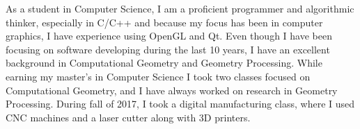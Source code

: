 \documentclass[10pt,stdletter,dateno,sigleft,letterpaper]{newlfm} %
\begin{document}
\begin{newlfm}
As a student in Computer Science, I am a proficient programmer and algorithmic thinker, especially in C/C++ and because my focus has been in computer graphics, I have experience using OpenGL and Qt. Even though I have been focusing on software developing during the last 10 years, I have an excellent background in Computational Geometry and Geometry Processing. While earning my master's in Computer Science I took two classes focused on Computational Geometry, and I have always worked on research in Geometry Processing. During fall of 2017, I took a digital manufacturing class, where I used CNC machines and a laser cutter along with 3D printers.



\end{newlfm}
\end{document}
